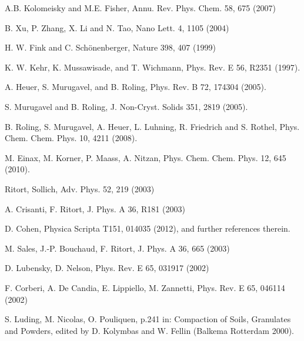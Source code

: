 \documentclass[aps,pre,floats,floatfix,twocolumn]{revtex4}
\begin{document}
\begin{thebibliography}{99}
A.B. Kolomeisky and M.E. Fisher, Annu. Rev. Phys. Chem. 58, 675 (2007)

B. Xu, P. Zhang, X. Li and N. Tao, Nano Lett. 4, 1105 (2004)

H. W. Fink and C. Sch\"onenberger, Nature 398, 407 (1999)


K. W. Kehr, K. Mussawisade, and T. Wichmann,
Phys. Rev. E 56, R2351 (1997).

A. Heuer, S. Murugavel, and B. Roling,
Phys. Rev. B 72, 174304 (2005).

S. Murugavel and B. Roling, 
J. Non-Cryst. Solids 351, 2819 (2005).

B. Roling, S. Murugavel, A. Heuer, L. Luhning, R. Friedrich and S. Rothel, 
Phys. Chem. Chem. Phys. 10, 4211 (2008).

M. Einax, M. Korner, P. Maass, A. Nitzan,
Phys. Chem. Chem. Phys. 12, 645 (2010).




Ritort, Sollich, 
Adv. Phys. 52, 219 (2003)

A. Crisanti, F. Ritort,  
J. Phys. A 36, R181 (2003) 


D. Cohen, 
Physica Scripta T151, 014035 (2012), 
and further references therein. 

M. Sales, J.-P. Bouchaud, F. Ritort, 
J. Phys. A 36, 665 (2003) 

D. Lubensky, D. Nelson, 
Phys. Rev. E 65, 031917 (2002)

F. Corberi, A. De Candia, E. Lippiello, M. Zannetti, 
Phys. Rev. E 65, 046114 (2002)

S. Luding, M. Nicolas, O. Pouliquen, 
p.241 in: Compaction of Soils, Granulates and Powders, 
edited by D. Kolymbas and W. Fellin (Balkema Rotterdam 2000).



\end{thebibliography}
\end{document}
